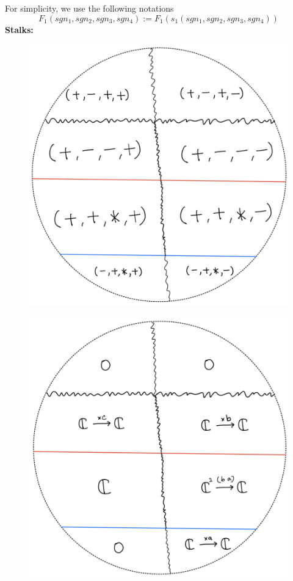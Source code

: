 For simplicity, we use the following notations
\[
F_1(sgn_1,sgn_2,sgn_3,sgn_4):= F_1(s_1(sgn_1,sgn_2,sgn_3,sgn_4))
\]
\textbf{Stalks:}
\begin{figure}[H]
    \centering
    \includegraphics[scale = 0.45]{diagrams/cobord'2/45.png} 
    \caption{}
    \label{fig:your-label}
\end{figure}
\begin{figure}[H]
    \centering
    \includegraphics[scale = 0.45]{diagrams/cobord'2/46.png} 
    \caption{}
    \label{fig:your-label}
\end{figure}

